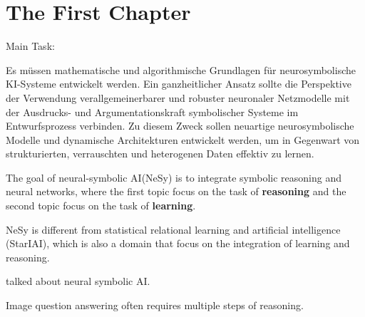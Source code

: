 \chapter{The First Chapter}



Main Task: 

Es müssen mathematische und algorithmische Grundlagen für neurosymbolische KI-Systeme entwickelt werden. Ein ganzheitlicher Ansatz sollte die Perspektive der Verwendung verallgemeinerbarer und robuster neuronaler Netzmodelle mit der Ausdrucks- und Argumentationskraft symbolischer Systeme im Entwurfsprozess verbinden. Zu diesem Zweck sollen neuartige neurosymbolische Modelle und dynamische Architekturen entwickelt werden, um in Gegenwart von strukturierten, verrauschten und heterogenen Daten effektiv zu lernen. 



The goal of neural-symbolic AI(NeSy) is to integrate symbolic reasoning and neural networks, where the first topic focus on the task of \textbf{reasoning} and the second topic focus on the task of \textbf{learning}. 

NeSy is different from statistical relational learning and artificial intelligence (StarIAI), which is also a domain that focus on the integration of learning and reasoning.


\cite{Susskind2021} talked about neural symbolic AI.





Image question answering often requires multiple steps of reasoning. \cite{SAN}



